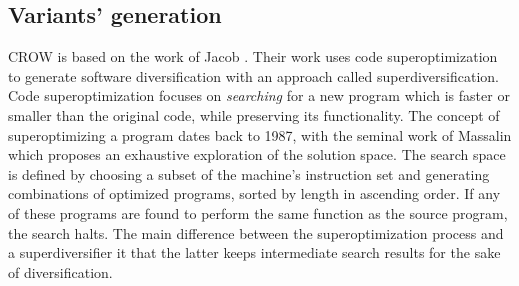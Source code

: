 \subsection*{Variants' generation}

CROW is based on the work of Jacob \etal \cite{jacob2008superdiversifier}. Their work uses code superoptimization to generate software diversification with an approach called superdiversification. 
Code superoptimization focuses on \emph{searching} for a new program which is faster or smaller than the original code, while preserving its functionality.
The concept of superoptimizing a program dates back to 1987, with the seminal work of Massalin \cite{Massalin1987} which proposes an exhaustive exploration of the solution space. The search space is defined by choosing a subset of the machine's instruction set and generating combinations of optimized programs, sorted by length in ascending order. If any of these programs are found to perform the same function as the source program, the search halts. The main difference between the superoptimization process and a superdiversifier it that the latter keeps intermediate search results for the sake of diversification. 

